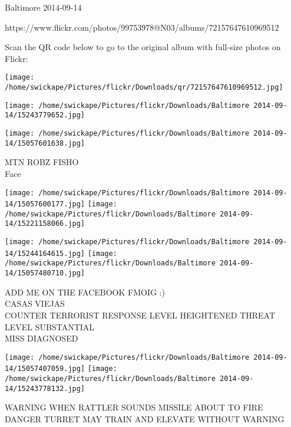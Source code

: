 \documentclass[10pt,letterpaper]{article}
\begin{document}
Baltimore 2014-09-14

https://www.flickr.com/photos/99753978@N03/albums/72157647610969512

Scan the QR code below to go to the original album with full-size photos on Flickr:

\texttt{[image: /home/swickape/Pictures/flickr/Downloads/qr/72157647610969512.jpg]}
\pagebreak

\texttt{[image: /home/swickape/Pictures/flickr/Downloads/Baltimore 2014-09-14/15243779652.jpg]}

\vspace{0.25in}
\texttt{[image: /home/swickape/Pictures/flickr/Downloads/Baltimore 2014-09-14/15057601638.jpg]}

MTN ROBZ FISHO\\
Face
\pagebreak

\texttt{[image: /home/swickape/Pictures/flickr/Downloads/Baltimore 2014-09-14/15057600177.jpg]}
\texttt{[image: /home/swickape/Pictures/flickr/Downloads/Baltimore 2014-09-14/15221158066.jpg]}

\texttt{[image: /home/swickape/Pictures/flickr/Downloads/Baltimore 2014-09-14/15244164615.jpg]}
\texttt{[image: /home/swickape/Pictures/flickr/Downloads/Baltimore 2014-09-14/15057480710.jpg]}

ADD ME ON THE FACEBOOK FMOIG :)\\
CASAS VIEJAS\\
COUNTER TERRORIST RESPONSE LEVEL HEIGHTENED THREAT LEVEL SUBSTANTIAL\\
MISS DIAGNOSED
\pagebreak

\texttt{[image: /home/swickape/Pictures/flickr/Downloads/Baltimore 2014-09-14/15057407059.jpg]}
\texttt{[image: /home/swickape/Pictures/flickr/Downloads/Baltimore 2014-09-14/15243778132.jpg]}

WARNING WHEN RATTLER SOUNDS MISSILE ABOUT TO FIRE\\
DANGER TURRET MAY TRAIN AND ELEVATE WITHOUT WARNING
\pagebreak
\end{document}
